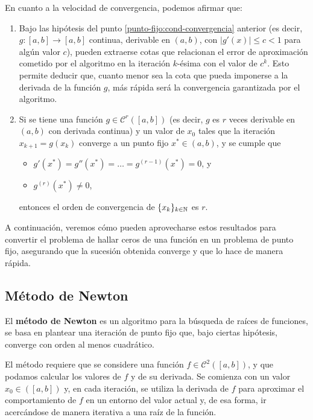 En cuanto a la velocidad de convergencia, podemos afirmar que:

\begin{enumerate}[label=(\roman*),resume]
\item Bajo las hipótesis del punto \ref{punto-fijo:cond-convergencia}
    anterior (es decir, $g:[a,b] \to [a,b]$ continua, derivable en $(a,b)$,
    con $\lvert g'(x) \rvert \leq c < 1$ para algún valor $c$), pueden
    extraerse cotas que relacionan el error de aproximación cometido por el
    algoritmo en la iteración $k$-ésima con el valor de $c^k$. Esto permite
    deducir que, cuanto menor sea la cota que pueda imponerse a la derivada de
    la función $g$, más rápida será la convergencia garantizada por el
    algoritmo.

\item Si se tiene una función $g \in \mathcal{C}^r([a,b])$ (es decir, $g$ es
    $r$ veces derivable en $(a,b)$ con derivada continua) y un valor de $x_0$
    tales que la iteración $x_{k+1} = g(x_k)$ converge a un punto fijo $x^\ast
    \in (a,b)$, y se cumple que
    \begin{itemize}
    \item $g'(x^\ast) = g''(x^\ast) = \dots = g^{(r-1)}(x^\ast) = 0$, y
    \item $g^{(r)}(x^\ast) \neq 0$,
    \end{itemize}
    entonces el orden de convergencia de $\lbrace x_k \rbrace_{k \in \mathbb{N}}$
    es $r$.
\end{enumerate}

A continuación, veremos cómo pueden aprovecharse estos resultados para
convertir el problema de hallar ceros de una función en un problema de punto
fijo, asegurando que la sucesión obtenida converge y que lo hace de manera
rápida.

\subsection{Método de Newton}

El \textbf{método de Newton} es un algoritmo para la búsqueda de raíces de
funciones, se basa en plantear una iteración de punto fijo que, bajo ciertas
hipótesis, converge con orden al menos cuadrático.

El método requiere que se considere una función $f \in \mathcal{C}^2([a,b])$, y que
podamos calcular los valores de $f$ y de su derivada. Se comienza con un valor
$x_0 \in ([a,b])$ y, en cada iteración, se utiliza la derivada de $f$ para aproximar el
comportamiento de $f$ en un entorno del valor actual y, de esa forma,
ir acercándose de manera iterativa a una raíz de la función.

